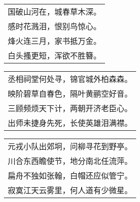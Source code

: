 \nopagebreak%
\nopagebreak%
\noindent\begin{minipage}{\linewidth}
  \vskip-3pt\begin{table}[H]
    \centering
    \begin{tabular}{@{}l@{}}
国破山河在，城春草木深。\\
感时花溅泪，恨别鸟惊心。\\
烽火连三月，家书抵万金。\\
白头搔更短，浑欲不胜簪。
    \end{tabular}
  \end{table}
\end{minipage}
\vspace{1cm}


\nopagebreak%
\nopagebreak%
\noindent\begin{minipage}{\linewidth}
  \vskip-3pt\begin{table}[H]
    \centering
    \begin{tabular}{@{}l@{}}
丞相祠堂何处寻，锦官城外柏森森。\\
映阶碧草自春色，隔叶黄鹂空好音。\\
三顾频烦天下计，两朝开济老臣心。\\
出师未捷身先死，长使英雄泪满襟。
    \end{tabular}
  \end{table}
\end{minipage}
\vspace{1cm}


\nopagebreak%
\nopagebreak%
\noindent\begin{minipage}{\linewidth}
  \vskip-3pt\begin{table}[H]
    \centering
    \begin{tabular}{@{}l@{}}
元戎小队出郊坰，问柳寻花到野亭。\\
川合东西瞻使节，地分南北任流萍。\\
扁舟不独如张翰，白帽还应似管宁。\\
寂寞江天云雾里，何人道有少微星。
    \end{tabular}
  \end{table}
\end{minipage}
\vspace{1cm}


